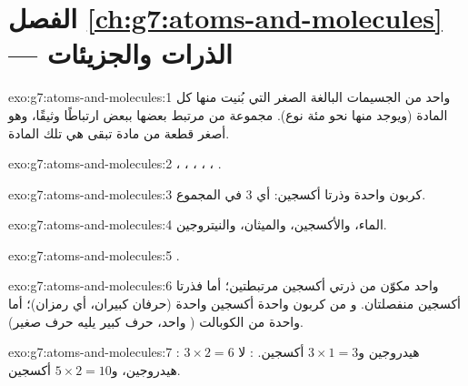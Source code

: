 \section*{الفصل \ref{ch:g7:atoms-and-molecules} --- الذرات والجزيئات}

\begin{solution}{exo:g7:atoms-and-molecules:1}
 واحد من الجسيمات البالغة الصغر التي بُنيت منها كل المادة (ويوجد منها
نحو مئة نوع).  مجموعة من  مرتبط بعضها ببعض ارتباطًا وثيقًا، وهو
أصغر قطعة من مادة تبقى هي تلك
المادة.
\end{solution}

\begin{solution}{exo:g7:atoms-and-molecules:2}
، ، ، ، ، .
\end{solution}

\begin{solution}{exo:g7:atoms-and-molecules:3}
 كربون واحدة وذرتا أكسجين: أي 3  في المجموع.
\end{solution}

\begin{solution}{exo:g7:atoms-and-molecules:4}
الماء، والأكسجين، والميثان، والنيتروجين.
\end{solution}

\begin{solution}{exo:g7:atoms-and-molecules:5}
.
\end{solution}

\begin{solution}{exo:g7:atoms-and-molecules:6}
  واحد مكوّن من ذرتي أكسجين مرتبطتين؛ أما  فذرتا
أكسجين منفصلتان. و  من  كربون واحدة  أكسجين
واحدة (حرفان كبيران، أي رمزان)؛ أما   واحدة من
الكوبالت ( واحد، حرف كبير يليه حرف صغير).
\end{solution}

\begin{solution}{exo:g7:atoms-and-molecules:7}
: $3\times 2 = 6$  هيدروجين و$3\times 1 = 3$ 
أكسجين. : لا هيدروجين، و$5\times 2 = 10$  أكسجين.
\end{solution}


